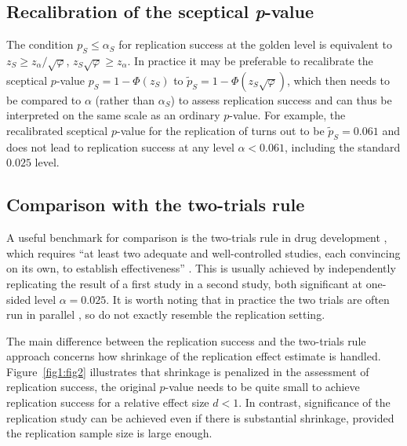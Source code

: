 \subsection{Recalibration of the sceptical \textit{p}-value}\label{sec1:recalib}

The condition $p_S \leq \alpha_S$ for replication success at the golden level is
equivalent to $z_S \geq z_\alpha / \sqrt{\varphi}$, \ie{}
$z_S \sqrt{\varphi} \geq z_\alpha$. In practice it may be preferable to
recalibrate the sceptical $p$-value $p_{S} = 1 - \Phi(z_S)$ to
$ \tilde{p}_S = 1 - \Phi(z_S \sqrt{\varphi})$, which then needs to be compared
to $\alpha$ (rather than $\alpha_S$) to assess replication success and can thus
be interpreted on the same scale as an ordinary $p$-value. For example, the
recalibrated sceptical $p$-value for the replication of \citet{Pyc2010} turns
out to be $\tilde{p}_S=0.061$ and does not lead to replication success at any
level $\alpha<0.061$, including the standard $0.025$ level.


\subsection{Comparison with the two-trials rule}\label{sec1:2TR}
A useful benchmark for comparison is the two-trials rule in drug development
\citep[Section 9.4]{Kay2015}, which requires ``at least two adequate and
well-controlled studies, each convincing on its own, to establish
effectiveness'' \citep[p.~3]{FDA1998}. This is usually achieved by independently
replicating the result of a first study in a second study, both significant at
one-sided level $\alpha=0.025$. {It is worth noting that in practice the two
  trials are often run in parallel} {\citep{Senn2008}}{, so do not exactly
  resemble the replication setting.}



The main difference between the replication success and the two-trials
rule approach concerns how shrinkage of the replication effect
estimate is handled. Figure~\ref{fig1:fig2} illustrates that
shrinkage is penalized in the assessment of replication success, \ie{}
the original $p$-value needs to be quite small to achieve replication
success for a relative effect size $d<1$. In contrast, significance of
the replication study can be achieved even if there is substantial
shrinkage, provided the replication sample size is large enough.


